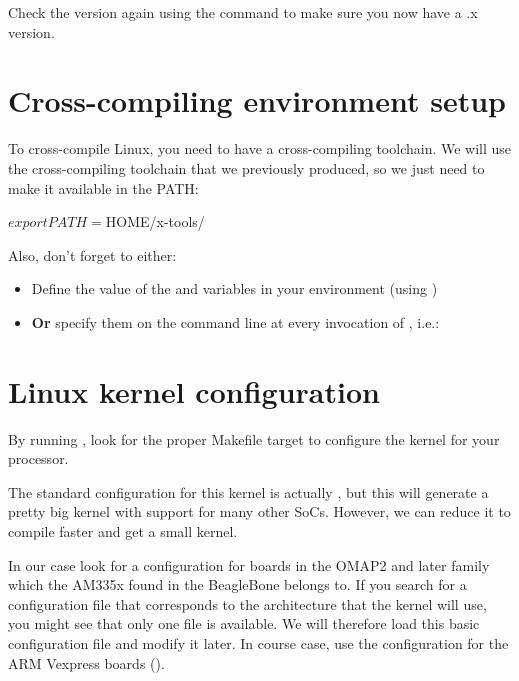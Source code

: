Check the version again using the  command
to make sure you now have a \workingkernel.x version.

\section{Cross-compiling environment setup}

To cross-compile Linux, you need to have a cross-compiling
toolchain. We will use the cross-compiling toolchain that we
previously produced, so we just need to make it available in the PATH:

\begin{bashinput}
$ export PATH=$HOME/x-tools/%
\end{bashinput}

Also, don't forget to either:

\begin{itemize}
\item Define the value of the  and 
  variables in your environment (using )
\item {\bf Or} specify them on the command line at every invocation of
  , i.e.: 
\end{itemize}
\section{Linux kernel configuration}

By running , look for the proper Makefile target to
configure the kernel for your processor.

{The standard configuration for this kernel is actually ,
but this will generate a pretty big kernel with support for many other
SoCs. However, we can reduce it to compile faster and get a small
kernel.}{}

{In our case look for a configuration for boards in the OMAP2 and
later family which the AM335x found in the BeagleBone belongs to.}{}
{If you search for a configuration file that corresponds to the 
architecture that the kernel will use, you might see that only one
 file is available. We will therefore load this basic
configuration file and modify it later.}{}
{In course case, use the configuration for the ARM Vexpress boards
().}{}


